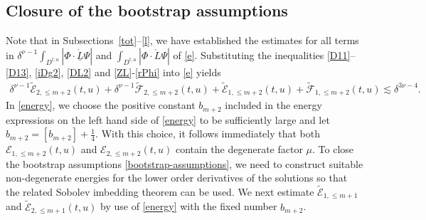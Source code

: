 \documentclass[11pt,twoside]{article}
\begin{document}
\subsection{Closure of the bootstrap assumptions}
Note that in Subsections~\ref{tot}--\ref{l}, we have established the estimates for all terms in $\delta^{\nu-1}\int_{D^{t, u}}|\Phi \cdot \mathring{\underline{L}}\Psi|$ and $\int_{D^{t, u}}|\Phi \cdot \mathring{L}\Psi|$ of \eqref{e}.
Substituting the inequalities \eqref{D11}--\eqref{D13}, \eqref{iDg2}, \eqref{DL2} and \eqref{ZL}-\eqref{rPhi} into \eqref{e}
yields
\begin{equation}\label{energy}
\begin{split}
\delta^{\nu-1} \widetilde{\mathcal{E}}_{2,\leq m+2}(t,u) + \delta^{\nu-1} \widetilde{\mathcal{F}}_{2,\leq m+2}(t,u) + \widetilde{\mathcal{E}}_{1,\leq m+2}(t,u) + \widetilde{\mathcal{F}}_{1,\leq m+2}(t,u)
\lesssim \delta^{3\nu-4}.
\end{split}
\end{equation}
In \eqref{energy}, we choose the positive constant $b_{m+2}$ included in the energy expressions on the left hand side of \eqref{energy}
to be sufficiently large and let $b_{m+2} = [b_{m+2}] + \frac{1}{4}$. With this choice, it follows immediately that
both $\mathcal{E}_{1,\leq m+2}(t,u)$ and $\mathcal{E}_{2,\leq m+2}(t,u)$ contain the degenerate factor $\mu$. To close the bootstrap assumptions \eqref{bootstrap-assumptions}, we need to construct suitable non-degenerate energies for the lower order derivatives of the solutions
so that the related Sobolev imbedding theorem can be used. We next estimate $\tilde{\mathcal{E}}_{1,\leq m+1}$ and $\tilde{\mathcal{E}}_{2,\leq m+1}(t,u)$ by use of \eqref{energy} with the fixed number $b_{m+2}$.
\end{document}
